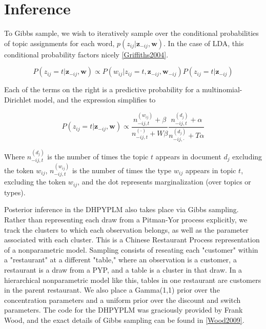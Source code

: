 \section{Inference}

To Gibbs sample, we wish to iteratively sample over the conditional probabilities of topic assignments for each word, $p(z_{ij}|\mathbf{z}_{-ij},\mathbf{w})$.  In the case of LDA, this conditional probability factors nicely \ref{Griffiths2004}.

\begin{equation}
P(z_{ij}=t | \mathbf{z}_{-ij},\mathbf{w}) \propto P(w_{ij}|z_{ij}=t, \mathbf{z}_{-ij}, \mathbf{w}_{-ij})P(z_{ij} = t | \mathbf{z}_{-ij})
\end{equation}

Each of the terms on the right is a predictive probability for a multinomial-Dirichlet model, and the expression simplifies to

\begin{equation}
P(z_{ij}=t | \mathbf{z}_{-ij},\mathbf{w}) \propto \frac{n^{(w_{ij})}_{-ij,t} + \beta}{n^{(\cdot)}_{-ij,t} + W\beta} \frac{n^{(d_j)}_{-ij,t} + \alpha}{n^{(d_j)}_{-ij,\cdot} + T\alpha} 
\end{equation}

Where $n^{(d_j)}_{-ij,t}$ is the number of times the topic $t$ appears in document $d_j$ excluding the token $w_{ij}$, $n^{(w_{ij})}_{-ij,t}$ is the number of times the type $w_{ij}$ appears in topic $t$, excluding the token $w_{ij}$, and the dot represents marginalization (over topics or types).

Posterior inference in the DHPYPLM also takes place via Gibbs sampling.  Rather than representing each draw from a Pitman-Yor process explicitly, we track the clusters to which each observation belongs, as well as the parameter associated with each cluster.  This is a Chinese Restaurant Process representation of a nonparametric model.  Sampling consists of reseating each "customer" within a "restaurant" at a different "table," where an observation is a customer, a restaurant is a draw from a PYP, and a table is a cluster in that draw. In a hierarchical nonparametric model like this, tables in one restaurant are customers in the parent restaurant.  We also place a Gamma(1,1) prior over the concentration parameters and a uniform prior over the discount and switch parameters.  The code for the DHPYPLM was graciously provided by Frank Wood, and the exact details of Gibbs sampling can be found in \ref{Wood2009}.

